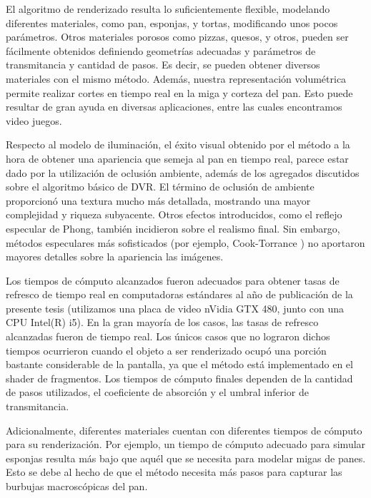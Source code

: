 
El algoritmo de renderizado resulta lo suficientemente flexible, modelando diferentes materiales, como pan, esponjas, y tortas, modificando unos pocos parámetros.
Otros materiales porosos como pizzas, quesos, y otros, pueden ser fácilmente obtenidos definiendo geometrías adecuadas y parámetros de transmitancia y cantidad de pasos.
Es decir, se pueden obtener diversos materiales con el mismo método.
Además, nuestra representación volumétrica permite realizar cortes en tiempo real en la miga y corteza del pan.
Esto puede resultar de gran ayuda en diversas aplicaciones, entre las cuales encontramos video juegos.

Respecto al modelo de iluminación, el éxito visual obtenido por el método a la hora de obtener una apariencia que semeja al pan en tiempo real, parece estar dado por la utilización de oclusión ambiente, además de los agregados discutidos sobre el algoritmo básico de DVR.
El término de oclusión de ambiente proporcionó una textura mucho más detallada, mostrando una mayor complejidad y riqueza subyacente.
Otros efectos introducidos, como el reflejo especular de Phong, también incidieron sobre el realismo final.
Sin embargo, métodos especulares más sofisticados (por ejemplo, Cook-Torrance \cite{Cook1982}) no aportaron mayores detalles sobre la apariencia las imágenes.


Los tiempos de cómputo alcanzados fueron adecuados para obtener tasas de refresco de tiempo real en computadoras estándares al año de publicación de la presente tesis (utilizamos una placa de video nVidia GTX 480, junto con una \acrshort{CPU} Intel(R) i5).
En la gran mayoría de los casos, las tasas de refresco alcanzadas fueron de tiempo real.
Los únicos casos que no lograron dichos tiempos ocurrieron cuando el objeto a ser renderizado ocupó una porción bastante considerable de la pantalla, ya que el método está implementado en el shader de fragmentos.
Los tiempos de cómputo finales dependen de la cantidad de pasos utilizados, el coeficiente de absorción y el umbral inferior de transmitancia.

Adicionalmente, diferentes materiales cuentan con diferentes tiempos de cómputo para su renderización.
Por ejemplo, un tiempo de cómputo adecuado para simular esponjas resulta más bajo que aquél que se necesita para modelar migas de panes.
Esto se debe al hecho de que el método necesita más pasos para capturar las burbujas macroscópicas del pan.

